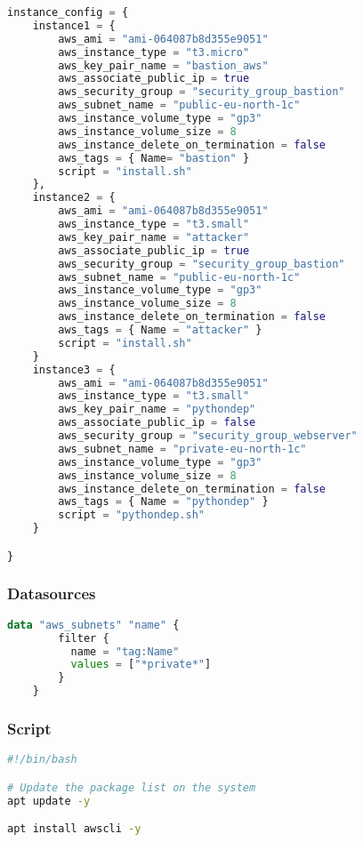 \begin{lstlisting}[language=terraform]
  instance_config = {
    instance1 = {
        aws_ami = "ami-064087b8d355e9051"
        aws_instance_type = "t3.micro"
        aws_key_pair_name = "bastion_aws"
        aws_associate_public_ip = true
        aws_security_group = "security_group_bastion"
        aws_subnet_name = "public-eu-north-1c"
        aws_instance_volume_type = "gp3"
        aws_instance_volume_size = 8
        aws_instance_delete_on_termination = false
        aws_tags = { Name= "bastion" }
        script = "install.sh"
    },
    instance2 = {
        aws_ami = "ami-064087b8d355e9051"
        aws_instance_type = "t3.small"
        aws_key_pair_name = "attacker"
        aws_associate_public_ip = true
        aws_security_group = "security_group_bastion"
        aws_subnet_name = "public-eu-north-1c"
        aws_instance_volume_type = "gp3"
        aws_instance_volume_size = 8
        aws_instance_delete_on_termination = false
        aws_tags = { Name = "attacker" }
        script = "install.sh"
    }
    instance3 = {
        aws_ami = "ami-064087b8d355e9051"
        aws_instance_type = "t3.small"
        aws_key_pair_name = "pythondep"
        aws_associate_public_ip = false
        aws_security_group = "security_group_webserver"
        aws_subnet_name = "private-eu-north-1c"
        aws_instance_volume_type = "gp3"
        aws_instance_volume_size = 8
        aws_instance_delete_on_termination = false
        aws_tags = { Name = "pythondep" }
        script = "pythondep.sh"
    }

}
\end{lstlisting}

\subsubsection{
{Datasources}}

\begin{lstlisting}[language=terraform]
    data "aws_subnets" "name" {
        filter {
          name = "tag:Name"
          values = ["*private*"]
        }
    }
\end{lstlisting}

\subsubsection{
{Script}}

\begin{lstlisting}[language=bash, style=bashstyle]
#!/bin/bash

# Update the package list on the system
apt update -y

apt install awscli -y
\end{lstlisting}

